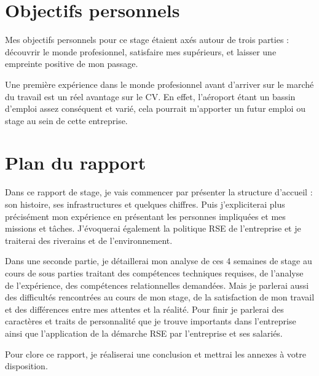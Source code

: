 \section{Objectifs personnels}

Mes objectifs personnels pour ce stage étaient axés autour de trois parties : découvrir le monde profesionnel, satisfaire mes supérieurs, et laisser une empreinte positive de mon passage.


Une première expérience dans le monde profesionnel avant d’arriver sur le marché du travail est un réel avantage sur le CV. En effet, l’aéroport étant un bassin d’emploi assez conséquent et varié, cela pourrait m’apporter un futur emploi ou stage au sein de cette entreprise.



\section{Plan du rapport}

Dans ce rapport de stage, je vais commencer par présenter la structure d'accueil : son histoire, ses infrastructures et quelques chiffres. Puis j'expliciterai plus précisément mon expérience en présentant les personnes impliquées et mes missions et tâches. J'évoquerai également la politique RSE de l'entreprise et je traiterai des riverains et de l'environnement.

Dans une seconde partie, je détaillerai mon analyse de ces 4 semaines de stage au cours de sous parties traitant des compétences techniques requises, de l'analyse de l'expérience, des compétences relationnelles demandées. Mais je parlerai aussi des difficultés rencontrées au cours de mon stage, de la satisfaction de mon travail et des différences entre mes attentes et la réalité. Pour finir je parlerai des caractères et traits de personnalité que je trouve importants dans l'entreprise ainsi que l'application de la démarche RSE par l'entreprise et ses salariés.

Pour clore ce rapport, je réaliserai une conclusion et mettrai les annexes à votre disposition.